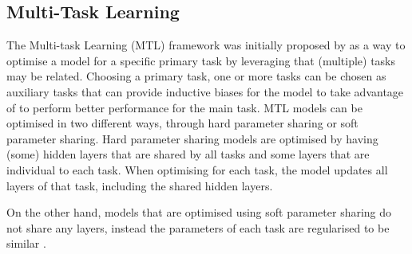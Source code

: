 \subsection{Multi-Task Learning}\label{sub:mtl}
The Multi-task Learning (MTL) framework was initially proposed by \citet{Caruana:1993} as a way to optimise a model for a specific primary task by leveraging that (multiple) tasks may be related.
Choosing a primary task, one or more tasks can be chosen as auxiliary tasks that can provide inductive biases for the model to take advantage of to perform better performance for the main task.
MTL models can be optimised in two different ways, through hard parameter sharing or soft parameter sharing.
Hard parameter sharing models are optimised by having (some) hidden layers that are shared by all tasks and some layers that are individual to each task.
When optimising for each task, the model updates all layers of that task, including the shared hidden layers.

On the other hand, models that are optimised using soft parameter sharing do not share any layers, instead the parameters of each task are regularised to be similar \citep{Duong:2015}.
%

